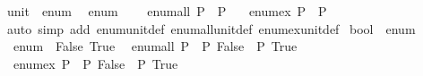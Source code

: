 \begin{isabellebody}
\endisatagproof
{\isafoldproof}%
%
\isadelimproof
%
\endisadelimproof
\isanewline
\isanewline
{}\isamarkupfalse%
\isanewline
\isanewline
{}\isamarkupfalse%
\ unit\ {\isacharcolon}{\kern0pt}{\isacharcolon}{\kern0pt}\ enum\isanewline
{}\isanewline
\isanewline
{}\isamarkupfalse%
\isanewline
\ \ {\isachardoublequoteopen}enum\ {\isacharequal}{\kern0pt}\ {\isacharbrackleft}{\kern0pt}{\isacharparenleft}{\kern0pt}{\isacharparenright}{\kern0pt}{\isacharbrackright}{\kern0pt}{\isachardoublequoteclose}\isanewline
\isanewline
{}\isamarkupfalse%
\isanewline
\ \ {\isachardoublequoteopen}enum{\isacharunderscore}{\kern0pt}all\ P\ {\isacharequal}{\kern0pt}\ P\ {\isacharparenleft}{\kern0pt}{\isacharparenright}{\kern0pt}{\isachardoublequoteclose}\isanewline
\isanewline
{}\isamarkupfalse%
\isanewline
\ \ {\isachardoublequoteopen}enum{\isacharunderscore}{\kern0pt}ex\ P\ {\isacharequal}{\kern0pt}\ P\ {\isacharparenleft}{\kern0pt}{\isacharparenright}{\kern0pt}{\isachardoublequoteclose}\isanewline
\isanewline
{}\isamarkupfalse%
%
\isadelimproof
\ %
\endisadelimproof
%
\isatagproof
{}\isamarkupfalse%
\isanewline
{}\isamarkupfalse%
\ {\isacharparenleft}{\kern0pt}auto\ simp\ add{\isacharcolon}{\kern0pt}\ enum{\isacharunderscore}{\kern0pt}unit{\isacharunderscore}{\kern0pt}def\ enum{\isacharunderscore}{\kern0pt}all{\isacharunderscore}{\kern0pt}unit{\isacharunderscore}{\kern0pt}def\ enum{\isacharunderscore}{\kern0pt}ex{\isacharunderscore}{\kern0pt}unit{\isacharunderscore}{\kern0pt}def{\isacharparenright}{\kern0pt}%
\endisatagproof
{\isafoldproof}%
%
\isadelimproof
%
\endisadelimproof
\isanewline
\isanewline
{}\isamarkupfalse%
\isanewline
\isanewline
{}\isamarkupfalse%
\ bool\ {\isacharcolon}{\kern0pt}{\isacharcolon}{\kern0pt}\ enum\isanewline
{}\isanewline
\isanewline
{}\isamarkupfalse%
\isanewline
\ \ {\isachardoublequoteopen}enum\ {\isacharequal}{\kern0pt}\ {\isacharbrackleft}{\kern0pt}False{\isacharcomma}{\kern0pt}\ True{\isacharbrackright}{\kern0pt}{\isachardoublequoteclose}\isanewline
\isanewline
{}\isamarkupfalse%
\isanewline
\ \ {\isachardoublequoteopen}enum{\isacharunderscore}{\kern0pt}all\ P\ {\isasymlongleftrightarrow}\ P\ False\ {\isasymand}\ P\ True{\isachardoublequoteclose}\isanewline
\isanewline
{}\isamarkupfalse%
\isanewline
\ \ {\isachardoublequoteopen}enum{\isacharunderscore}{\kern0pt}ex\ P\ {\isasymlongleftrightarrow}\ P\ False\ {\isasymor}\ P\ True{\isachardoublequoteclose}\isanewline

\end{isabellebody}
